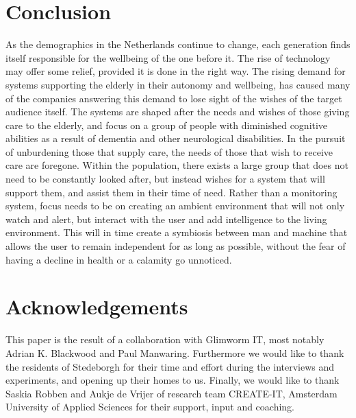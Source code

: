 \documentclass{below-ext}
\begin{document}
\section{Conclusion}
As the demographics in the Netherlands continue to change, each generation finds itself responsible for the wellbeing of the one before it. The rise of technology may offer some relief, provided it is done in the right way. The rising demand for systems supporting the elderly in their autonomy and wellbeing, has caused many of the companies answering this demand to lose sight of the wishes of the target audience itself. The systems are shaped after the needs and wishes of those giving care to the elderly, and focus on a group of people with diminished cognitive abilities as a result of dementia and other neurological disabilities. In the pursuit of unburdening those that supply care, the needs of those that wish to receive care are foregone. Within the population, there exists a large group that does not need to be constantly looked after, but instead wishes for a system that will support them, and assist them in their time of need. Rather than a monitoring system, focus needs to be on creating an ambient environment that will not only watch and alert, but interact with the user and add intelligence to the living environment. This will in time create a symbiosis between man and machine that allows the user to remain independent for as long as possible, without the fear of having a decline in health or a calamity go unnoticed.

\section{Acknowledgements}

This paper is the result of a collaboration with Glimworm IT, most notably Adrian K. Blackwood and Paul Manwaring. Furthermore we would like to thank the residents of Stedeborgh for their time and effort during the interviews and experiments, and opening up their homes to us. Finally, we would like to thank Saskia Robben and Aukje de Vrijer of research team CREATE-IT, Amsterdam University of Applied Sciences for their support, input and coaching.

\nocite{Kanis:2013:SMH:2534504.2534526}
\nocite{Robben:2013:LRA:2534504.2534555}
\nocite{NaitAicha:2013:LYG:2494091.2497283}
\nocite{stedeborgh}
\nocite{Nehmer:2006:LAS:1134285.1134293}
\balance


\end{document}
